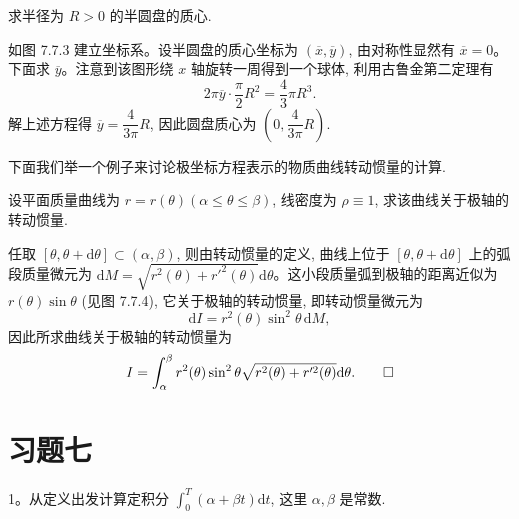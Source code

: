 \begin{example}\label{example:ma-7-7-2}
求半径为 $R>0$ 的半圆盘的质心.
\end{example}


\begin{solve}
如图 7.7.3 建立坐标系。设半圆盘的质心坐标为 $(\overline x,\overline y)$, 由对称性显然有 $\overline x=0$。下面求 $\overline y$。注意到该图形绕 $x$ 轴旋转一周得到一个球体, 利用古鲁金第二定理有
\[
  2\pi\overline y\cdot\frac{\pi}{2}R^2=\frac{4}{3}\pi R^3.
\]
解上述方程得 $\overline y=\dfrac{4}{3\pi}R$, 因此圆盘质心为 $\left(0,\dfrac{4}{3\pi}R\right)$.

下面我们举一个例子来讨论极坐标方程表示的物质曲线转动惯量的计算.
\end{solve}


\begin{example}\label{example:ma-7-7-3}
设平面质量曲线为 $r=r(\theta)(\alpha\leq\theta\leq\beta)$, 线密度为 $\rho\equiv1$, 求该曲线关于极轴的转动惯量.
\end{example}


\begin{solve}
任取 $[\theta,\theta+\mathrm d\theta]\subset(\alpha,\beta)$, 则由转动惯量的定义, 曲线上位于 $[\theta,\theta+\mathrm d\theta]$ 上的弧段质量微元为 $\mathrm dM=\sqrt{r^2(\theta)+r'^2(\theta)}\mathrm d\theta$。这小段质量弧到极轴的距离近似为 $r(\theta)\sin\theta$ (见图 7.7.4), 它关于极轴的转动惯量, 即转动惯量微元为
\[
  \mathrm dI=r^2(\theta)\sin^2\theta\,\mathrm dM,
\]
因此所求曲线关于极轴的转动惯量为
\[
  I=\int_\alpha^\beta r^2(\theta)\sin^2\theta
  \sqrt{r^2(\theta)+r'^2(\theta)}\mathrm d\theta.
\qedhere
\]
\end{solve}


\section*{习题七}
{}
\label{exercises:ma-7}

1。从定义出发计算定积分 $\int_0^T(\alpha+\beta t)\mathrm dt$, 这里 $\alpha,\beta$ 是常数.

